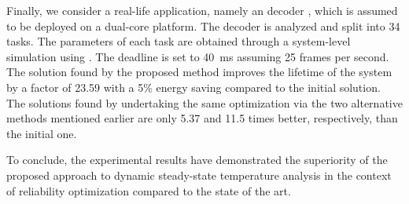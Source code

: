 Finally, we consider a real-life application, namely an  decoder
\cite{ffmpeg}, which is assumed to be deployed on a dual-core platform. The
decoder is analyzed and split into 34 tasks. The parameters of each task are
obtained through a system-level simulation using  \cite{benini2005}.
The deadline is set to 40~ms assuming 25 frames per second. The solution found
by the proposed method improves the lifetime of the system by a factor of 23.59
with a 5\% energy saving compared to the initial solution. The solutions found
by undertaking the same optimization via the two alternative methods mentioned
earlier are only 5.37 and 11.5 times better, respectively, than the initial one.

To conclude, the experimental results have demonstrated the superiority of the
proposed approach to dynamic steady-state temperature analysis in the context of
reliability optimization compared to the state of the art.
